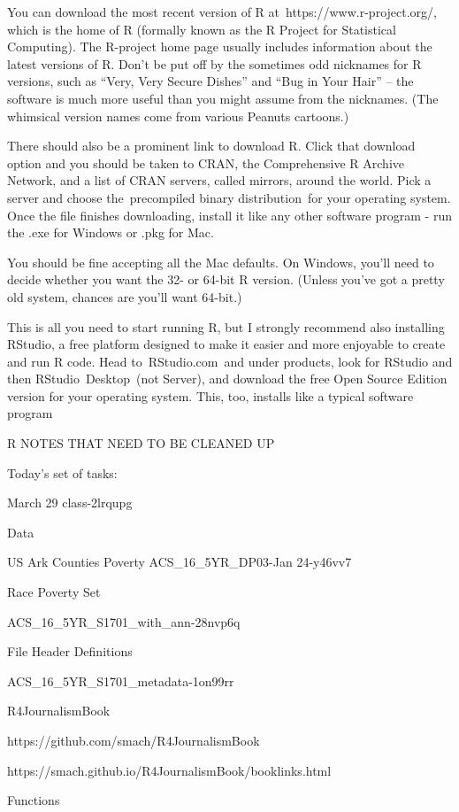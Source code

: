 \documentclass[]{book}
\begin{document}
You can download the most recent version of R at~https://www.r-project.org/, which is the home of R (formally known as the R Project for Statistical Computing). The R-project home page usually includes information about the latest versions of R. Don't be put off by the sometimes odd nicknames for R versions, such as ``Very, Very Secure Dishes'' and ``Bug in Your Hair'' -- the software is much more useful than you might assume from the nicknames. (The whimsical version names come from various Peanuts cartoons.)

There should also be a prominent link to download R. Click that download option and you should be taken to CRAN, the Comprehensive R Archive Network, and a list of CRAN servers, called mirrors, around the world. Pick a server and choose the~precompiled binary distribution~for your operating system. Once the file finishes downloading, install it like any other software program - run the .exe for Windows or .pkg for Mac.

You should be fine accepting all the Mac defaults. On Windows, you'll need to decide whether you want the 32- or 64-bit R version. (Unless you've got a pretty old system, chances are you'll want 64-bit.)

This is all you need to start running R, but I strongly recommend also installing RStudio, a free platform designed to make it easier and more enjoyable to create and run R code. Head to~RStudio.com~and under products, look for RStudio and then RStudio~Desktop~(not Server), and download the free Open Source Edition version for your operating system. This, too, installs like a typical software program

R NOTES THAT NEED TO BE CLEANED UP

Today's set of tasks:

March 29 class-2lrqupg

Data

US Ark Counties Poverty ACS\_16\_5YR\_DP03-Jan 24-y46vv7

Race Poverty Set

ACS\_16\_5YR\_S1701\_with\_ann-28nvp6q

File Header Definitions

ACS\_16\_5YR\_S1701\_metadata-1on99rr

R4JournalismBook

https://github.com/smach/R4JournalismBook

https://smach.github.io/R4JournalismBook/booklinks.html

Functions
\end{document}
